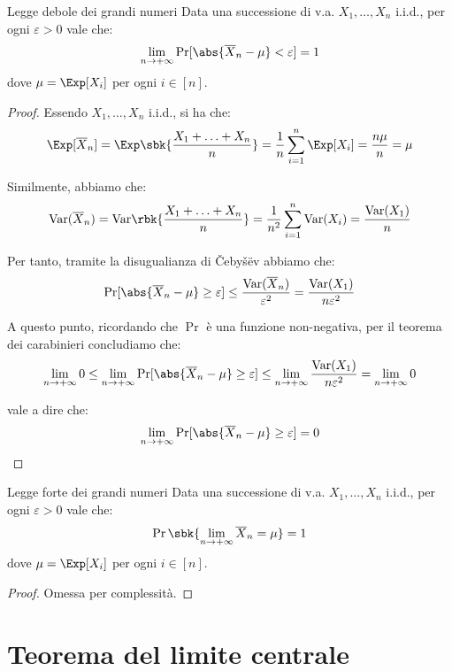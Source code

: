 \documentclass[a4paper, 12pt]{report}
\begin{document}
    \begin{framedthm}{Legge debole dei grandi numeri}
        Data una successione di v.a. $X_1, \ldots, X_n$ i.i.d., per ogni $\varepsilon > 0$ vale che:
        \[\lim_{n \to +\infty} \Pr[\abs{\overline{X}_n - \mu} < \varepsilon] = 1\]
        dove $\mu = \Exp[X_i]$ per ogni $i \in [n]$. 
    \end{framedthm}

    \begin{proof}
        Essendo $X_1, \ldots, X_n$ i.i.d., si ha che:
        \[\Exp[\overline{X}_n] = \Exp \sbk{\frac{X_1 + \ldots + X_n}{n}} = \frac{1}{n} \sum_{i = 1}^n \Exp[X_i] = \frac{n\mu}{n} = \mu\]
        
        Similmente, abbiamo che:
        \[\mathrm{Var}(\overline{X}_n) = \mathrm{Var}\rbk{\frac{X_1 + \ldots + X_n}{n}} = \frac{1}{n^2} \sum_{i = 1}^n \mathrm{Var}(X_i) = \frac{\mathrm{Var}(X_1)}{n}\]

        Per tanto, tramite la disugualianza di Čebyšëv abbiamo che:
        \[\Pr[\abs{\overline{X}_n - \mu} \geq \varepsilon] \leq \frac{\mathrm{Var}(\overline{X}_n)}{\varepsilon^2} = \frac{\mathrm{Var}(X_1)}{n\varepsilon^2}\]

        A questo punto, ricordando che $\Pr$ è una funzione non-negativa, per il teorema dei carabinieri concludiamo che:
        \[\lim_{n \to +\infty} 0 \leq \lim_{n \to +\infty} \Pr[\abs{\overline{X}_n - \mu} \geq \varepsilon] \leq \lim_{n \to +\infty} \frac{\mathrm{Var}(X_1)}{n\varepsilon^2} = \lim_{n \to +\infty} 0 \]

        vale a dire che:
        \[\lim_{n \to +\infty} \Pr[\abs{\overline{X}_n - \mu} \geq \varepsilon] = 0\]
    \end{proof}

    \begin{framedthm}{Legge forte dei grandi numeri}
        Data una successione di v.a. $X_1, \ldots, X_n$ i.i.d., per ogni $\varepsilon > 0$ vale che:
        \[\Pr\sbk{\lim_{n \to +\infty} \overline{X}_n = \mu} = 1\]
        dove $\mu = \Exp[X_i]$ per ogni $i \in [n]$. 
    \end{framedthm}

    \begin{proof}
        Omessa per complessità.
    \end{proof}

    \section{Teorema del limite centrale}
\end{document}
